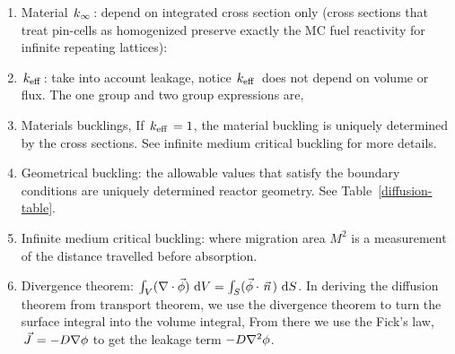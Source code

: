 \documentclass{school-22.211-notes}
\date{April 12, 2012}
\begin{document}
\maketitle

\begin{enumerate}

\item Material $\left. k_{\infty} \right.$: depend on integrated cross section only (cross sections that treat pin-cells as homogenized preserve exactly the MC fuel reactivity for infinite repeating lattices): 

\item $\left. k_{\mathrm{eff}} \right.$: take into account leakage, notice $\left. k_{\mathrm{eff}} \right.$ does not depend on volume or flux. The one group and two group expressions are, 

\item Materials bucklings,
If $\left. k_{\mathrm{eff}} \right. = 1$, the material buckling is uniquely determined by the cross sections. See infinite medium critical buckling for more details. 

\item Geometrical buckling: the allowable values that satisfy the boundary conditions are uniquely determined reactor geometry. See Table~\ref{diffusion-table}. 

\item Infinite medium critical buckling: where migration area $M^2$ is a measurement of the distance travelled before absorption. 

\item Divergence theorem: $\int_V (\nabla \cdot \vec{\phi} ) \mbox{ }\mathrm{d} V = \int_S (\vec{\phi} \cdot \left.\vec{n}\right.) \mbox{ }\mathrm{d} S$. In deriving the diffusion theorem from transport theorem, we use the divergence theorem to turn the surface integral into the volume integral,
  From there we use the Fick's law, $\left.\vec{J}\right. = - D \nabla \phi$ to get the leakage term $-D \nabla^2 \phi$. 


\end{enumerate}
\end{document}
